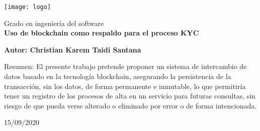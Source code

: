 \begin{titlepage}
   \begin{center}
       \vspace*{1cm}
\texttt{[image: logo]}

		\vspace{1.5cm}
       \LARGE     
       Grado en ingeniería del software\\
       \Huge
       \textbf{Uso de blockchain como respaldo para el proceso KYC}
            
       \vspace{1.5cm}

		\Large
       \textbf{Autor: Christian Karem Taidi Santana}

       \vspace{3cm}  
       Resumen: El presente trabajo pretende proponer un sistema de intercambio de datos basado en la tecnología blockchain, asegurando la persistencia de la transacción, sin los datos, de forma permanente e inmutable, lo que permitiría tener un registro de los procesos de alta en un servicio para futuras consultas, sin riesgo de que pueda verse alterado o eliminado por error o de forma intencionada.
            
       \vspace{0.8cm}
     
       
       
       15/09/2020
            
   \end{center}
\end{titlepage}